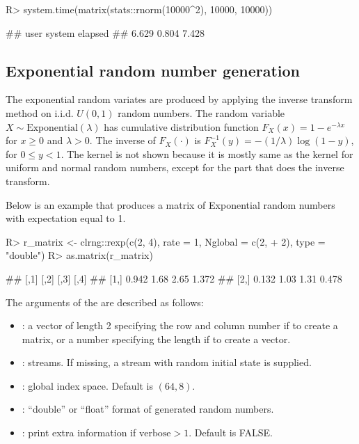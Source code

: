 \documentclass[article,nojss]{jss}\usepackage[]{graphicx}\usepackage[]{color}
\newcommand{\fct}[1]{\code{#1()}}
\begin{document}
\begin{CodeChunk}
\begin{CodeInput}
R> system.time(matrix(stats::rnorm(10000^2), 10000, 10000))
\end{CodeInput}
\begin{CodeOutput}
##    user  system elapsed 
##   6.629   0.804   7.428
\end{CodeOutput} 
\end{CodeChunk} 



\subsection{Exponential random number generation}
The exponential random variates are produced by applying the inverse transform method on i.i.d. $U(0,1)$ random numbers. The random variable $X \sim \text{Exponential}(\lambda)$ has cumulative distribution function $F_{X}(x)=1-e^{-\lambda x}$ for $x \geq 0$ and $\lambda > 0$. The inverse of $F_{X}(\cdot)$ is $F^{-1}_{X}(y)= -(1/ \lambda) \log (1-y)$, for $ 0 \leq y <1$. The kernel is not shown because it is mostly same as the kernel for uniform and normal random numbers, except for the part that does the inverse transform. %

Below is an example that produces a matrix of Exponential random numbers with expectation equal to 1.
\begin{CodeChunk}
\begin{CodeInput}
R> r_matrix <- clrng::rexp(c(2, 4), rate = 1, Nglobal = c(2,
+    2), type = "double")
R> as.matrix(r_matrix)
\end{CodeInput}
\begin{CodeOutput}
##       [,1] [,2] [,3]  [,4]
## [1,] 0.942 1.68 2.65 1.372
## [2,] 0.132 1.03 1.31 0.478
\end{CodeOutput} 
\end{CodeChunk} 

The arguments of the \fct{clrng::rexp} are described as follows:
\begin{itemize}
\itemsep0em 
  \item {}: a vector of length 2 specifying the row and column number if to create a matrix, or a number specifying the length if to create a vector.
  \item {}: streams. If missing, a stream with random initial state is supplied.
  \item {}: global index space. Default is $(64,8)$.
  \item {}: ``double'' or ``float'' format of generated random numbers.
  \item {}: print extra information if $\text{verbose} > 1$. Default is FALSE.
\end{itemize}
\end{document}
